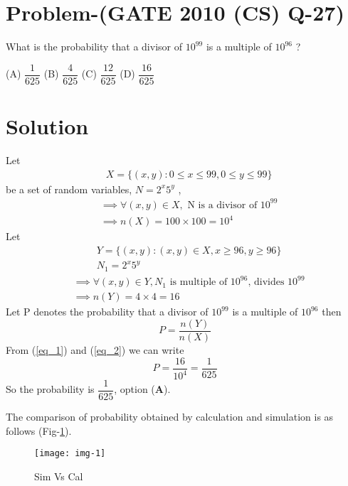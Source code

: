 \documentclass[journal,12pt,twocolumn]{IEEEtran}
\begin{document}
\section*{Problem-(GATE 2010 (CS) Q-27)}
What is the probability that a divisor of $10^{99}$ is a multiple of $10^{96}$ ?

\vspace{0.5 cm}

(A) $\dfrac{1}{625}$ \hspace{0.5 cm} (B) $\dfrac{4}{625}$ \hspace{0.5 cm} (C) $\dfrac{12}{625}$ \hspace{0.5 cm} (D) $\dfrac{16}{625}$

\section*{Solution}

Let 
\begin{align*}
& X= \{ (x,y) : 0\leq x \leq 99 ,0\leq y \leq 99 \}
\end{align*} 
be a set of random variables, $N=2^x5^y$ , 
\begin{align}
& \implies \forall (x,y) \in X, \text{ N is a divisor of } 10^{99}\\
&\implies n (X) = 100\times 100=10^4 \label{eq_1}
\end{align}
Let 
\begin{align*}
&Y=\{(x,y) : (x,y)\in X , x \geq 96,y\geq 96\}\\
&N_1= 2^x5^y 
\end{align*}
\begin{align}
&\implies \forall (x,y) \in  Y ,N_1  \text{ is multiple of } 10^{96} \text{, divides } 10^{99} \\
&\implies n(Y)=4\times 4=16 \label{eq_2}
\end{align}
Let P denotes the probability that a divisor of $10^{99}$ is a multiple of $10^{96}$ then
$$P=\dfrac{n(Y)}{n(X)}$$
From (\ref{eq_1}) and (\ref{eq_2}) we can write
$$P=\dfrac{16}{10^4}=\dfrac{1}{625}$$
So the probability is $\dfrac{1}{625}$, option (\textbf{A}).
\vspace{0.5 cm}

The comparison of probability obtained by calculation and simulation is as follows (Fig-\ref{fig_0}).

\begin{figure}[h]
    \centering
    \texttt{[image: img-1]}
    \caption{Sim Vs Cal}
    \label{fig_0}
\end{figure}
\end{document}
